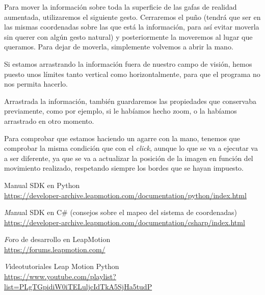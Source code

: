 \documentclass[11pt,a4paper]{article}
\begin{document}
Para mover la información sobre toda la superficie de las gafas de realidad aumentada, utilizaremos el siguiente gesto. Cerraremos el puño
(tendrá que ser en las mismas coordenadas sobre las que está la información, para así evitar moverla sin querer con algún gesto natural) y
posteriormente la moveremos al lugar que queramos. Para dejar de moverla, simplemente volvemos a abrir la mano.

Si estamos arrastrando la información fuera de nuestro campo de visión, hemos puesto unos límites tanto vertical como horizontalmente, para que
el programa no nos permita hacerlo.

Arrastrada la información, también guardaremos las propiedades que conservaba previamente, como por ejemplo, si le habíamos hecho zoom, o la
habíamos arrastrado en otro momento.

Para comprobar que estamos haciendo un agarre con la mano, tenemos que
comprobar la misma condición que con el \textit{click}, aunque lo que se va
a ejecutar va a ser diferente, ya que se va a actualizar la posición de la
imagen en función del movimiento realizado, respetando siempre los bordes
que se hayan impuesto.

\newpage

\begin{thebibliography}{5}
Manual SDK en Python
\\\url{https://developer-archive.leapmotion.com/documentation/python/index.html}

\textit
Manual SDK en C\# (consejos sobre el mapeo del sistema de coordenadas)
\\\url{https://developer-archive.leapmotion.com/documentation/csharp/index.html}

\textit
Foro de desarrollo en LeapMotion
\\\url{https://forums.leapmotion.com/}

\textit
Videotutoriales Leap Motion Python
\\\url{https://www.youtube.com/playlist?list=PLgTGpidiW0iTELuljcIdTkA5SjHa5tudP}
\end{thebibliography}
\end{document}
